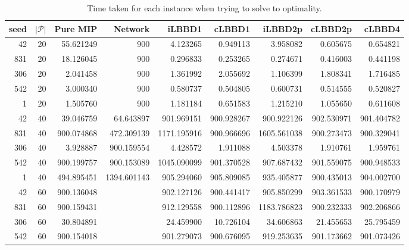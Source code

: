 \begin{table*}
    \centering
    \caption{Time taken for each instance when trying to solve to optimality.}
    \begin{tabular}{rrrrrrrrr} \toprule
        seed & $|\mathcal{P}|$ & Pure MIP & Network & iLBBD1 & cLBBD1 & iLBBD2p & cLBBD2p & cLBBD4 \\\midrule
        42     &       20    & 55.621249 &  900     & 4.123265 &  0.949113 & 3.958082 & 0.605675 & 0.654821 \\
       831     &       20    &18.126045 &   900     & 0.296833 &  0.253265 & 0.274671 & 0.416003 & 0.441198 \\
      306       &     20     &2.041458  &   900     & 1.361992 & 2.055692 & 1.106399 & 1.808341 & 1.716485 \\
      542       &     20     &3.000340  &  900     &  0.580737 & 0.504805 & 0.600731 & 0.514555 & 0.520827 \\
        1      &      20     &1.505760  &  900     & 1.181184 & 0.651583 & 1.215210 & 1.055650 & 0.611608 \\\midrule
       42      &      40    &   39.046759 & 64.643897  &  901.969151 & 900.928267  & 900.922126 &  902.530971 & 901.404782 \\
     831       &     40    & 900.074868 &  472.309139   &  1171.195916 & 900.966696 & 1605.561038 &  900.273473 & 900.329041 \\
     306       &     40    &  3.928887 &   900.159554   &     4.428572  &  1.911088  &   4.503378  &  1.910761  &  1.959761 \\
    542       &     40   & 900.199757 &   900.153089   &  1045.090099  & 901.370528  & 907.687432 &  901.559075 & 900.948533 \\
     1        &    40  &  494.895451  &  1394.601143    &  905.294060 &  905.809085  &  935.405877 & 900.435013 & 904.002700 \\\midrule
     42       &     60 &  900.136048  &       & 902.127126 &  900.441417  & 905.850299 &  903.361533 &  900.170979 \\
     831      &      60 &  900.159431  &      & 912.129558 & 900.112896 & 1183.786823 &  900.232333 &  902.206866 \\
     306      &      60  &  30.804891 &      &  24.459900  & 10.726104  &  34.606863 &  21.455653 &  25.795459 \\
     542      &      60 & 900.154018 &      &  901.279073 & 900.676095 &  919.253635 & 901.173662 & 901.073426 \\

\end{tabular}
\end{table*}
